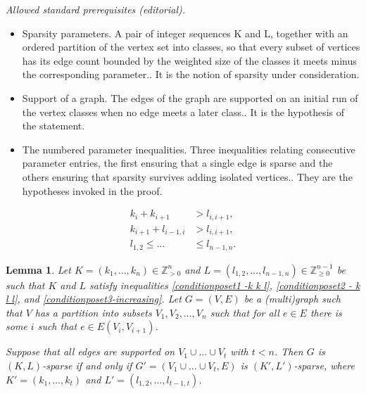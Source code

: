 \documentclass[10pt,a4paper]{article}
\newtheorem{lemma}[theorem]{Lemma}
\newtheorem{rem
ark}[theorem]{Remark}
\begin{document}
\noindent\textit{Allowed standard prerequisites (editorial).}\begin{itemize}
\item Sparsity parameters. A pair of integer sequences K and L, together with an ordered partition of the vertex set into classes, so that every subset of vertices has its edge count bounded by the weighted size of the classes it meets minus the corresponding parameter.. It is the notion of sparsity under consideration.
\item Support of a graph. The edges of the graph are supported on an initial run of the vertex classes when no edge meets a later class.. It is the hypothesis of the statement.
\item The numbered parameter inequalities. Three inequalities relating consecutive parameter entries, the first ensuring that a single edge is sparse and the others ensuring that sparsity survives adding isolated vertices.. They are the hypotheses invoked in the proof.
\end{itemize}\medskip
\begin{align}
    k_i + k_{i+1} &> l_{i, i+1} \label{conditionposet1 -k k l},\\
    k_{i+1} + l_{i-1, i} &> l_{i, i+1}\label{conditionposet2 - k l l},\\
     l_{1,2} \leq  \dots &\leq l_{n-1,n}. \label{conditionposet3-increasing}
\end{align}

\begin{lemma}
    Let $K=(k_1, \dots, k_n)\in  \mathbb{Z}_{>0}^{n}$ and $L= (l_{1,2}, \dots, l_{n-1,n})\in  \mathbb{Z}_{\geq 0}^{n-1}$ be such that $K$ and $L$ satisfy inequalities \eqref{conditionposet1 -k k l}, \eqref{conditionposet2 - k l l}, and \eqref{conditionposet3-increasing}. Let $G=(V,E)$ be a (multi)graph such that $V$ has a partition into subsets $V_1, V_2, \dots, V_n$ such that for all $e\in E$ there is some $i$ such that $e \in E(V_i, V_{i+1})$.
    
         Suppose that all edges are supported on $V_1\cup \dots \cup V_{t}$ with $t<n$. Then $G$ is $(K, L)$-sparse if and only if $G'= (V_1\cup \dots \cup V_{t}, E)$ is $(K',L')$-sparse, where $K'= (k_1, \dots, k_t)$ and $L'= (l_{1,2}, \dots, l_{t-1, t})$.
\end{lemma}
\end{document}
